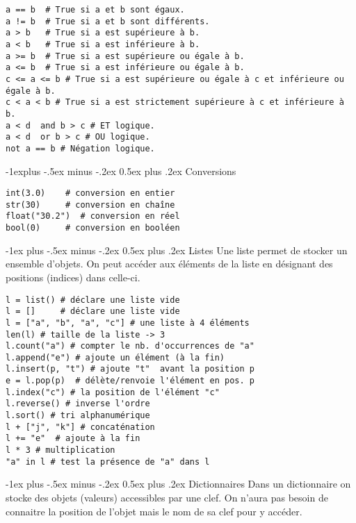 \documentclass[10pt,landscape]{article}
\makeatletter
\renewcommand{\section}{\@startsection{section}{1}{0mm}%
                                {-1ex plus -.5ex minus -.2ex}%
                                {0.5ex plus .2ex}%
                                {\normalfont\large\bfseries}}
\renewcommand{\subsection}{\@startsection{subsection}{2}{0mm}%
                                {-1explus -.5ex minus -.2ex}%
                                {0.5ex plus .2ex}%
                                {\normalfont\normalsize\bfseries}}
\makeatother
\begin{document}
\begin{multicols}{3}
\begin{lstlisting}
a == b	# True si a et b sont égaux.
a != b	# True si a et b sont différents.
a > b	# True si a est supérieure à b.
a < b	# True si a est inférieure à b.
a >= b	# True si a est supérieure ou égale à b.
a <= b	# True si a est inférieure ou égale à b.
c <= a <= b # True si a est supérieure ou égale à c et inférieure ou égale à b.
c < a < b # True si a est strictement supérieure à c et inférieure à b.
a < d  and b > c # ET logique.
a < d  or b > c # OU logique.
not a == b # Négation logique.
\end{lstlisting}


\subsection{Conversions}
\begin{lstlisting}
int(3.0)    # conversion en entier
str(30)     # conversion en chaîne
float("30.2")  # conversion en réel
bool(0)     # conversion en booléen
\end{lstlisting}


\section{Listes}
Une liste permet de stocker un ensemble d'objets. On peut accéder aux éléments de la liste en désignant des positions (indices) dans celle-ci.

\begin{lstlisting}
l = list() # déclare une liste vide
l = []     # déclare une liste vide
l = ["a", "b", "a", "c"] # une liste à 4 éléments
len(l) # taille de la liste -> 3
l.count("a") # compter le nb. d'occurrences de "a" 
l.append("e") # ajoute un élément (à la fin)
l.insert(p, "t") # ajoute "t"  avant la position p   
e = l.pop(p)  # délète/renvoie l'élément en pos. p      
l.index("c") # la position de l'élément "c"
l.reverse() # inverse l'ordre
l.sort() # tri alphanumérique
l + ["j", "k"] # concaténation
l += "e"  # ajoute à la fin
l * 3 # multiplication
"a" in l # test la présence de "a" dans l
\end{lstlisting}


\section{Dictionnaires}
Dans un dictionnaire on stocke des objets (valeurs) accessibles par une clef. On n'aura pas besoin de connaitre la position de l'objet mais le nom de sa clef pour y accéder.


\end{multicols}
\end{document}
